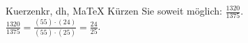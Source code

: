 \begin{MAufgabe}{Kuerzen}{kr, dh, MaTeX}
K\"urzen Sie soweit m\"oglich: $\frac{1320}{1375}$.\\ 
\ifLsg\MLoesung
\quad $\frac{1320}{1375}=\frac{(55)\cdot(24)}{(55)\cdot(25)}=\frac{24}{25}$.\else\relax\fi
 \end{MAufgabe}
